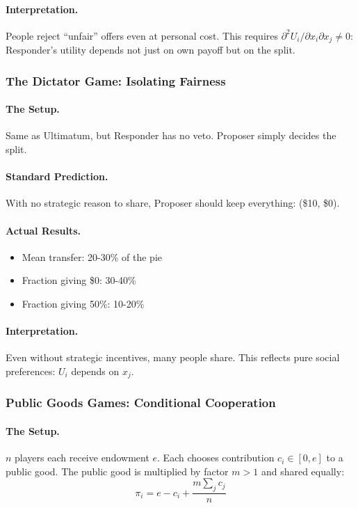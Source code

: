 \documentclass[12pt,a4paper]{article}
\begin{document}
\paragraph{Interpretation.}
People reject ``unfair'' offers even at personal cost.
This requires $\partial^2 U_i / \partial x_i \partial x_j \neq 0$:
Responder's utility depends not just on own payoff but on the split.

\subsubsection{The Dictator Game: Isolating Fairness}

\paragraph{The Setup.}
Same as Ultimatum, but Responder has no veto. Proposer simply decides the split.

\paragraph{Standard Prediction.}
With no strategic reason to share, Proposer should keep everything: (\$10, \$0).

\paragraph{Actual Results.}
\begin{itemize}
  \item Mean transfer: 20-30\% of the pie
  \item Fraction giving \$0: 30-40\%
  \item Fraction giving 50\%: 10-20\%
\end{itemize}

\paragraph{Interpretation.}
Even without strategic incentives, many people share.
This reflects pure social preferences: $U_i$ depends on $x_j$.

\subsubsection{Public Goods Games: Conditional Cooperation}

\paragraph{The Setup.}
$n$ players each receive endowment $e$. Each chooses contribution $c_i \in [0, e]$ to a public good.
The public good is multiplied by factor $m > 1$ and shared equally:
\begin{equation}
  \pi_i = e - c_i + \frac{m \sum_j c_j}{n}
\end{equation}
\end{document}
